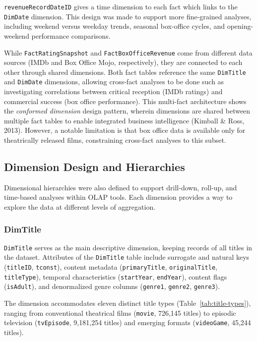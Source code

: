 \verb|revenueRecordDateID| gives a time dimension to each fact which links to the \verb|DimDate| dimension. This design was made to support more fine-grained analyses, including weekend versus weekday trends, seasonal box-office cycles, and opening-weekend performance comparisons.

While \verb|FactRatingSnapshot| and \verb|FactBoxOfficeRevenue| come from different data sources (IMDb and Box Office Mojo, respectively), they are connected to each other through shared dimensions. Both fact tables reference the same \verb|DimTitle| and \verb|DimDate| dimensions, allowing cross-fact analyses to be done such as investigating correlations between critical reception (IMDb ratings) and commercial success (box office performance). This multi-fact architecture shows the \textit{conformed dimension} design pattern, wherein dimensions are shared between multiple fact tables to enable integrated business intelligence (Kimball \& Ross, 2013). However, a notable limitation is that box office data is available only for theatrically released films, constraining cross-fact analyses to this subset.

\subsection{Dimension Design and Hierarchies}

Dimensional hierarchies were also defined to support drill-down, roll-up, and time-based analyses within OLAP tools. Each dimension provides a way to explore the data at different levels of aggregation.

\subsubsection{DimTitle}

\verb|DimTitle| serves as the main descriptive dimension, keeping records of all titles in the dataset. Attributes of the \verb|DimTitle| table include surrogate and natural keys (\verb|titleID|, \verb|tconst|), content metadata (\verb|primaryTitle|, \verb|originalTitle|, \verb|titleType|), temporal characteristics (\verb|startYear|, \verb|endYear|), content flags (\verb|isAdult|), and denormalized genre columns (\verb|genre1|, \verb|genre2|, \verb|genre3|).

The dimension accommodates eleven distinct title types (Table~\ref{tab:title-types}), ranging from conventional theatrical films (\verb|movie|, 726,145 titles) to episodic television (\verb|tvEpisode|, 9,181,254 titles) and emerging formats (\verb|videoGame|, 45,244 titles).

